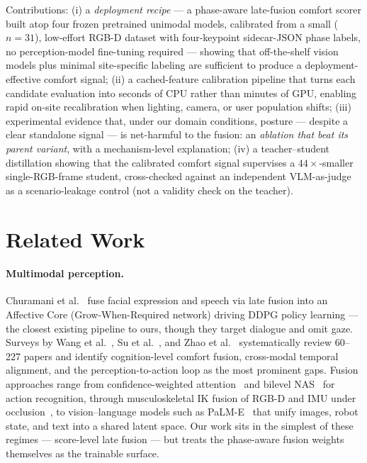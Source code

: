\documentclass{article}
\begin{document}
Contributions: (i) a \emph{deployment recipe} --- a phase-aware late-fusion comfort scorer built atop four frozen pretrained unimodal models, calibrated from a small ($n=31$), low-effort RGB-D dataset with four-keypoint sidecar-JSON phase labels, no perception-model fine-tuning required --- showing that off-the-shelf vision models plus minimal site-specific labeling are sufficient to produce a deployment-effective comfort signal; (ii) a cached-feature calibration pipeline that turns each candidate evaluation into seconds of CPU rather than minutes of GPU, enabling rapid on-site recalibration when lighting, camera, or user population shifts; (iii) experimental evidence that, under our domain conditions, posture --- despite a clear standalone signal --- is net-harmful to the fusion: an \emph{ablation that beat its parent variant}, with a mechanism-level explanation; (iv) a teacher--student distillation showing that the calibrated comfort signal supervises a $44\times$-smaller single-RGB-frame student, cross-checked against an independent VLM-as-judge as a scenario-leakage control (not a validity check on the teacher).

\section{Related Work}

\paragraph{Multimodal perception.} Churamani et al.~\cite{ref16} fuse facial expression and speech via late fusion into an Affective Core (Grow-When-Required network) driving DDPG policy learning --- the closest existing pipeline to ours, though they target dialogue and omit gaze. Surveys by Wang et al.~\cite{ref02}, Su et al.~\cite{ref03}, and Zhao et al.~\cite{ref04} systematically review 60--227 papers and identify cognition-level comfort fusion, cross-modal temporal alignment, and the perception-to-action loop as the most prominent gaps. Fusion approaches range from confidence-weighted attention~\cite{ref18} and bilevel NAS~\cite{ref19} for action recognition, through musculoskeletal IK fusion of RGB-D and IMU under occlusion~\cite{ref20}, to vision--language models such as PaLM-E~\cite{ref21} that unify images, robot state, and text into a shared latent space. Our work sits in the simplest of these regimes --- score-level late fusion --- but treats the phase-aware fusion weights themselves as the trainable surface.
\end{document}
